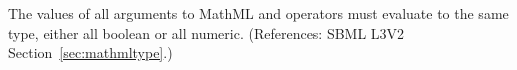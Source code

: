 The values of all arguments to MathML  and  operators
must evaluate to the same type, either all boolean or all numeric.
(References: SBML L3V2 Section~\ref{sec:mathmltype}.)
